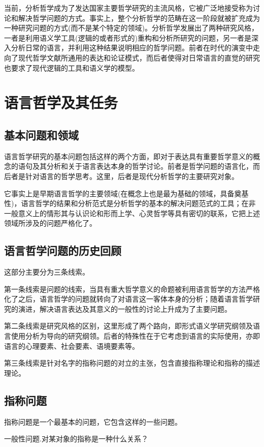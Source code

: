 \documentclass{article}
\begin{document}
当前，分析哲学成为了发达国家主要哲学研究的主流风格，它被广泛地接受称为讨论和解决哲学问题的方式。事实上，整个分析哲学的范畴在这一阶段就被扩充成为一种研究问题的方式(而不是某个特定的领域)。分析哲学发展出了两种研究风格，一者是利用语义学工具(逻辑的或者形式的)重构和分析所研究的问题，另一者是深入分析日常的语言，并利用这种结果说明相应的哲学问题。前者在时代的演变中走向了现代哲学文献所通用的表达和论证模式，而后者使得对日常语言的直觉的研究也要求了现代逻辑的工具和语义学的模型。
\section{语言哲学及其任务}
\subsection{基本问题和领域}
语言哲学研究的基本问题包括这样的两个方面，即对于表达具有重要哲学意义的概念的语句及其分析和关于语言表达本身的哲学讨论。前者是哲学问题的语言化，而后者是针对语言的哲学思考。这里，后者是现代分析哲学的主要研究对象。

它事实上是早期语言哲学的主要领域(在概念上也是最为基础的领域，具备奠基性)，语言哲学的结果和分析范式是分析哲学的基本的解决问题范式的工具；在非一般意义上的情形其与认识论和形而上学、心灵哲学等具有密切的联系，它把上述领域所涉及的问题严格化了。

\subsection{语言哲学问题的历史回顾}
这部分主要分为三条线索。

第一条线索是问题的线索，当具有重大哲学意义的命题被利用语言哲学的方法严格化了之后，语言哲学的问题就转向了对语言这一客体本身的分析；随着语言哲学研究的演进，解决语言表达及其意义的一般性的讨论上升成为了主要问题。

第二条线索是研究风格的区别，这里形成了两个路向，即形式语义学研究纲领及语言使用分析为导向的研究纲领。后者的特殊性在于它考虑到语言的实际使用，亦即语言的心理要素、社会要素、语境要素等。

第三条线索是针对名字的指称问题的对立的主张，包含直接指称理论和指称的描述理论。

\subsection{指称问题}
指称问题是一个最基本的问题，它包含这样的一些问题。

{\heiti 一般性问题.}对某对象的指称是一种什么关系？
\end{document}
